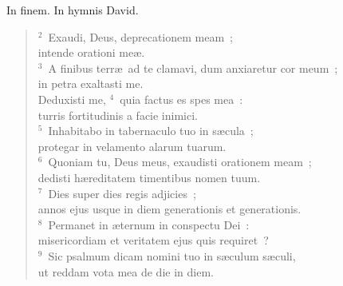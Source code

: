 \lettrine[lines=3,image=true,loversize=0.05,lraise=-0.03]{I}{}n finem. In hymnis David.
\begin{flushleft}\begin{verse}\vspace{6pt}${}^{2}$~Exaudi, Deus, deprecationem meam~;\\ intende orationi me\ae .\\
${}^{3}$~A finibus terr\ae\ ad te clamavi, dum anxiaretur cor meum~;\\ in petra exaltasti me.\\ Deduxisti me,
${}^{4}$~quia factus es spes mea~:\\ turris fortitudinis a facie inimici.\\
${}^{5}$~Inhabitabo in tabernaculo tuo in s\ae cula~;\\ protegar in velamento alarum tuarum.\\
${}^{6}$~Quoniam tu, Deus meus, exaudisti orationem meam~;\\ dedisti h\ae reditatem timentibus nomen tuum.\\
${}^{7}$~Dies super dies regis adjicies~;\\ annos ejus usque in diem generationis et generationis.\\
${}^{8}$~Permanet in \ae ternum in conspectu Dei~:\\ misericordiam et veritatem ejus quis requiret~?\\
${}^{9}$~Sic psalmum dicam nomini tuo in s\ae culum s\ae culi,\\ ut reddam vota mea de die in diem.\end{verse}\end{flushleft}



